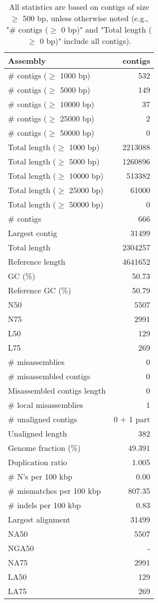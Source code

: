 \documentclass[12pt,a4paper]{article}
\begin{document}
\begin{table}[ht]
\begin{center}
\caption{All statistics are based on contigs of size $\geq$ 500 bp, unless otherwise noted (e.g., "\# contigs ($\geq$ 0 bp)" and "Total length ($\geq$ 0 bp)" include all contigs).}
\begin{tabular}{|l*{1}{|r}|}
\hline
Assembly & contigs \\ \hline
\# contigs ($\geq$ 1000 bp) & 532 \\ \hline
\# contigs ($\geq$ 5000 bp) & 149 \\ \hline
\# contigs ($\geq$ 10000 bp) & 37 \\ \hline
\# contigs ($\geq$ 25000 bp) & 2 \\ \hline
\# contigs ($\geq$ 50000 bp) & 0 \\ \hline
Total length ($\geq$ 1000 bp) & 2213088 \\ \hline
Total length ($\geq$ 5000 bp) & 1260896 \\ \hline
Total length ($\geq$ 10000 bp) & 513382 \\ \hline
Total length ($\geq$ 25000 bp) & 61000 \\ \hline
Total length ($\geq$ 50000 bp) & 0 \\ \hline
\# contigs & 666 \\ \hline
Largest contig & 31499 \\ \hline
Total length & 2304257 \\ \hline
Reference length & 4641652 \\ \hline
GC (\%) & 50.73 \\ \hline
Reference GC (\%) & 50.79 \\ \hline
N50 & 5507 \\ \hline
N75 & 2991 \\ \hline
L50 & 129 \\ \hline
L75 & 269 \\ \hline
\# misassemblies & 0 \\ \hline
\# misassembled contigs & 0 \\ \hline
Misassembled contigs length & 0 \\ \hline
\# local misassemblies & 1 \\ \hline
\# unaligned contigs & 0 + 1 part \\ \hline
Unaligned length & 382 \\ \hline
Genome fraction (\%) & 49.391 \\ \hline
Duplication ratio & 1.005 \\ \hline
\# N's per 100 kbp & 0.00 \\ \hline
\# mismatches per 100 kbp & 807.35 \\ \hline
\# indels per 100 kbp & 0.83 \\ \hline
Largest alignment & 31499 \\ \hline
NA50 & 5507 \\ \hline
NGA50 & - \\ \hline
NA75 & 2991 \\ \hline
LA50 & 129 \\ \hline
LA75 & 269 \\ \hline
\end{tabular}
\end{center}
\end{table}
\end{document}
